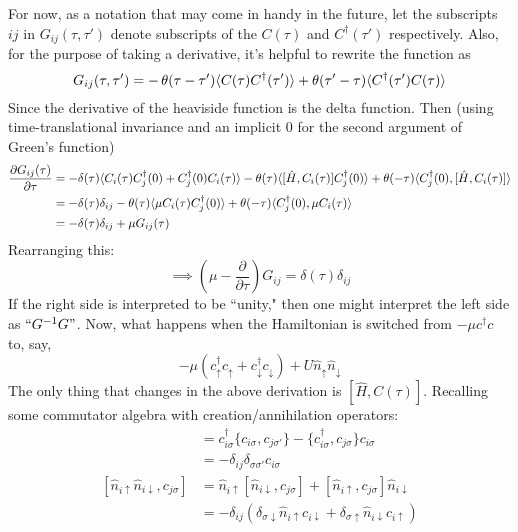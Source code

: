 \documentclass{article}
\begin{document}
For now, as a notation that may come in handy in the future, let the subscripts $ij$ in $G_{ij}(\tau,\tau')$ denote subscripts of the $C(\tau)$ and $C^\dagger(\tau')$ respectively. Also, for the purpose of taking a derivative, it's helpful to rewrite the function as 
\begin{equation*} G_{ij}(\tau, \tau') = -\operatorname{\theta}(\tau-\tau')\langle C(\tau)C^\dagger(\tau') \rangle + \operatorname{\theta}(\tau'-\tau)\langle C^\dagger(\tau')C(\tau) \rangle \end{equation*} 
Since the derivative of the heaviside function is the delta function. Then (using time-translational invariance and an implicit 0 for the second argument of Green's function)  
\begin{align*}
\frac{\partial G_{ij}(\tau)}{\partial \tau} &= -\delta(\tau)\langle C_i(\tau)C_j^\dagger(0) + C_j^\dagger(0) C_i(\tau) \rangle -\operatorname{\theta}(\tau)\langle [\hat{H}, C_i(\tau)]C_j^\dagger(0) \rangle + \operatorname{\theta}(-\tau)\langle C_j^\dagger(0),[\hat{H}, C_i(\tau)] \rangle \\
&= -\delta(\tau)\delta_{ij} - \operatorname{\theta}(\tau)\langle \mu C_i(\tau)C_j^\dagger(0) \rangle + \theta(-\tau)\langle C_j^\dagger(0), \mu C_i(\tau) \rangle \\
&= -\delta(\tau)\delta_{ij} + \mu G_{ij}(\tau) 
\end{align*}
Rearranging this:
\begin{equation*}
\implies (\mu - \frac{\partial}{\partial \tau})G_{ij} = \delta(\tau)\delta_{ij} \end{equation*}
If the right side is interpreted to be ``unity," then one might interpret the left side as $``G^{-1} G" $. Now, what happens when the Hamiltonian is switched from $-\mu c^\dagger c$ to, say, \begin{equation*}-\mu (c_\uparrow^\dagger c_\uparrow + c_\downarrow^\dagger c_\downarrow) + U\hat{n}_\uparrow\hat{n}_\downarrow \end{equation*} The only thing that changes in the above derivation is $[\hat{H}, C(\tau)]$. Recalling some commutator algebra with creation/annihilation operators:
\begin{align*}
[\hat{n}_{i\sigma}, c_{j\sigma'}] &= c^\dagger_{i\sigma}\{c_{i\sigma}, c_{j\sigma'}\} - \{c^\dagger_{i\sigma}, c_{j\sigma}\}c_{i\sigma} \\&= -\delta_{ij}\delta_{\sigma\sigma'}c_{i\sigma} \\
[\hat{n}_{i\uparrow}\hat{n}_{i\downarrow}, c_{j\sigma}] &= \hat{n}_{i\uparrow}[\hat{n}_{i\downarrow}, c_{j\sigma}] + [\hat{n}_{i\uparrow}, c_{j\sigma}]\hat{n}_{i\downarrow} \\
&= -\delta_{ij}(\delta_{\sigma\downarrow}\hat{n}_{i\uparrow}c_{i\downarrow} + \delta_{\sigma\uparrow}\hat{n}_{i\downarrow}c_{i\uparrow})
\end{align*}
\end{document}
